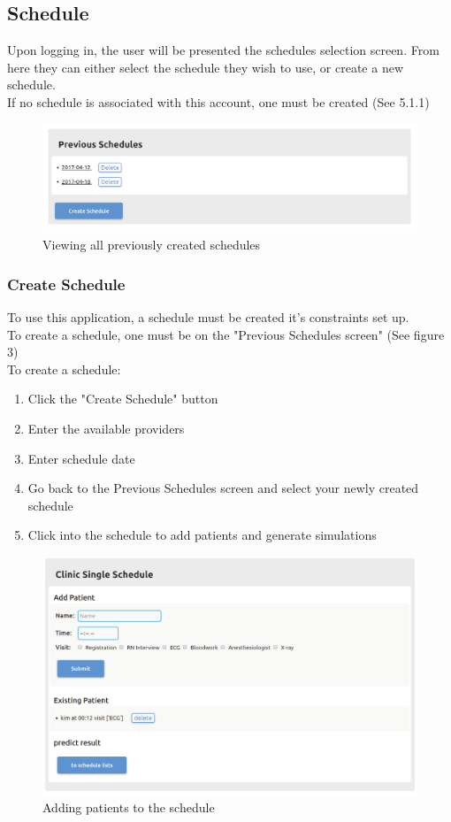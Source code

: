 \documentclass[12pt]{article}
\begin{document}
\subsection{Schedule}
Upon logging in, the user will be presented the schedules selection screen. From here they can either select the schedule they wish to use, or create a new schedule.\\

If no schedule is associated with this account, one must be created (See 5.1.1)\\

\begin{figure}[H]
\centering
\includegraphics[width=\textwidth]{scheduleList}
\caption{Viewing all previously created schedules}
\end{figure}

\subsubsection{Create Schedule}
To use this application, a schedule must be created it's constraints set up.\\
To create a schedule, one must be on the "Previous Schedules screen" (See figure 3)\\

To create a schedule:
\begin{enumerate}
\item Click the "Create Schedule" button
\item Enter the available providers
\item Enter schedule date
\item Go back to the Previous Schedules screen and select your newly created schedule
\item Click into the schedule to add patients and generate simulations
\end{enumerate}
\begin{figure}[H]
\centering
\includegraphics[width=\textwidth]{sim}
\caption{Adding patients to the schedule}
\end{figure}
\end{document}
